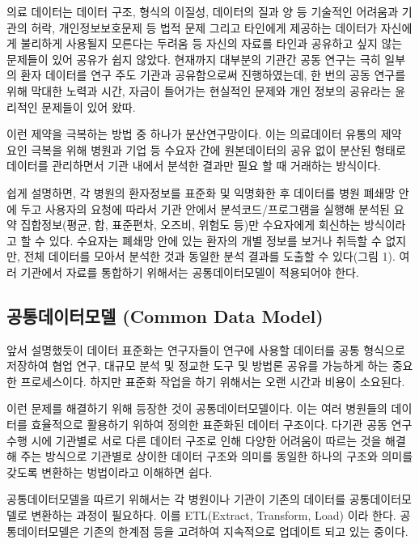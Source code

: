 \documentclass[]{book}
\begin{document}
의료 데이터는 데이터 구조, 형식의 이질성, 데이터의 질과 양 등 기술적인 어려움과 기관의 허락, 개인정보보호문제 등 법적 문제 그리고 타인에게 제공하는 데이터가 자신에게 불리하게 사용될지 모른다는 두려움 등 자신의 자료를 타인과 공유하고 싶지 않는 문제들이 있어 공유가 쉽지 않았다. 현재까지 대부분의 기관간 공동 연구는 극히 일부의 환자 데이터를 연구 주도 기관과 공유함으로써 진행하였는데, 한 번의 공동 연구를 위해 막대한 노력과 시간, 자금이 들어가는 현실적인 문제와 개인 정보의 공유라는 윤리적인 문제들이 있어 왔따.

이런 제약을 극복하는 방법 중 하나가 분산연구망이다. 이는 의료데이터 유통의 제약 요인 극복을 위해 병원과 기업 등 수요자 간에 원본데이터의 공유 없이 분산된 형태로 데이터를 관리하면서 기관 내에서 분석한 결과만 필요 할 때 거래하는 방식이다.

쉽게 설명하면, 각 병원의 환자정보를 표준화 및 익명화한 후 데이터를 병원 폐쇄망 안에 두고 사용자의 요청에 따라서 기관 안에서 분석코드/프로그램을 실행해 분석된 요약 집합정보(평균, 합, 표준편차, 오즈비, 위험도 등)만 수요자에게 회신하는 방식이라고 할 수 있다. 수요자는 폐쇄망 안에 있는 환자의 개별 정보를 보거나 취득할 수 없지만, 전체 데이터를 모아서 분석한 것과 동일한 분석 결과를 도출할 수 있다(그림 1). 여러 기관에서 자료를 통합하기 위해서는 공통데이터모델이 적용되어야 한다.

\hypertarget{common-data-model}{%
\subsection{공통데이터모델 (Common Data Model)}\label{common-data-model}}

앞서 설명했듯이 데이터 표준화는 연구자들이 연구에 사용할 데이터를 공통 형식으로 저장하여 협업 연구, 대규모 분석 및 정교한 도구 및 방법론 공유를 가능하게 하는 중요한 프로세스이다. 하지만 표준화 작업을 하기 위해서는 오랜 시간과 비용이 소요된다.

이런 문제를 해결하기 위해 등장한 것이 공통데이터모델이다. 이는 여러 병원들의 데이터를 효율적으로 활용하기 위하여 정의한 표준화된 데이터 구조이다. 다기관 공동 연구 수행 시에 기관별로 서로 다른 데이터 구조로 인해 다양한 어려움이 따르는 것을 해결해 주는 방식으로 기관별로 상이한 데이터 구조와 의미를 동일한 하나의 구조와 의미를 갖도록 변환하는 벙법이라고 이해하면 쉽다.

공통데이터모델을 따르기 위해서는 각 병원이나 기관이 기존의 데이터를 공통데이터모델로 변환하는 과정이 필요하다. 이를 ETL(Extract, Transform, Load) 이라 한다. 공통데이터모델은 기존의 한계점 등을 고려하여 지속적으로 업데이트 되고 있는 중이다.
\end{document}
